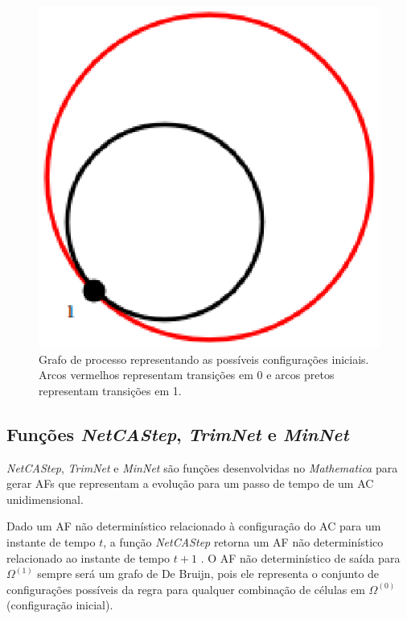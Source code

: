 \documentclass[12pt,a4paper]{article}
\begin{document}
\begin{figure}[htp]
\begin{center}
\includegraphics[scale=0.3]{img/InitialConfig.eps}
\caption{Grafo de processo representando as possíveis configurações
iniciais. Arcos vermelhos representam transições em 0 e arcos
pretos representam transições em 1.}
\label{fig:initconfigmathematica}
\end{center}
\end{figure}

\subsection{Funções \emph{NetCAStep}, \emph{TrimNet} e \emph{MinNet}}

\emph{NetCAStep}, \emph{TrimNet} e \emph{MinNet}  são
funções desenvolvidas no \textit{Mathematica} para gerar AFs
que representam a evolução para um passo de tempo de um AC
unidimensional.

Dado um AF não determinístico relacionado à configuração do AC para
um instante de tempo $t$, a função \emph{NetCAStep} 
retorna um AF não determinístico relacionado ao instante de tempo $t+1$
. O AF não determinístico de saída para $\Omega^{(1)}$
sempre será um grafo de De Bruijn, pois ele representa o conjunto de
configurações possíveis da regra para qualquer combinação de células
em $\Omega^{(0)}$ (configuração inicial).
\end{document}
